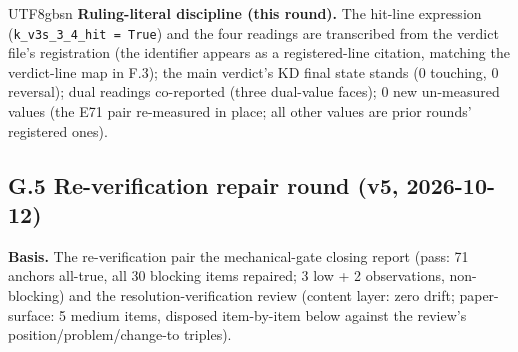 \documentclass[11pt,letterpaper]{article}
\begin{document}
\begin{CJK}{UTF8}{gbsn}
\textbf{Ruling-literal discipline (this round).} The hit-line expression (\texttt{k\_v3s\_3\_4\_hit = True}) and the four readings are transcribed from the verdict file's registration (the identifier appears as a registered-line citation, matching the verdict-line map in F.3); the main verdict's KD final state stands (0 touching, 0 reversal); dual readings co-reported (three dual-value faces); 0 new un-measured values (the E71 pair re-measured in place; all other values are prior rounds' registered ones).

\subsection*{G.5 Re-verification repair round (v5, 2026-10-12)}

\textbf{Basis.} The re-verification pair \textemdash{} the mechanical-gate closing report (pass: 71 anchors all-true, all 30 blocking items repaired; 3 low + 2 observations, non-blocking) and the resolution-verification review (content layer: zero drift; paper-surface: 5 medium items, disposed item-by-item below against the review's position/problem/change-to triples).


\end{CJK}
\end{document}
